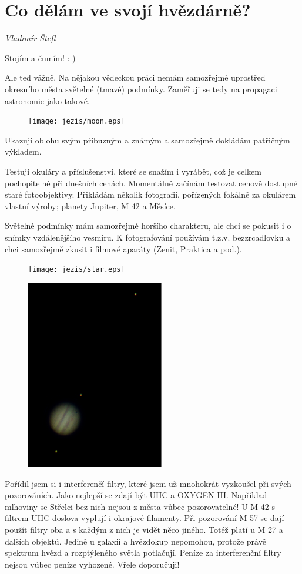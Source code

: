 \documentclass[10pt,a5paper,twoside]{book}
\newcommand{\autor}[1]{
	\begin{flushright}
	\textit{#1}
	\end{flushright}
}
\begin{document}
\section*{Co dělám ve svojí hvězdárně?}
\autor{Vladimír Štefl}
Stojím a čumím! :-)

Ale teď vážně. Na nějakou vědeckou práci nemám samozřejmě uprostřed okresního města světelné (tmavé) podmínky. Zaměřuji se tedy na propagaci astronomie jako takové.
\begin{figure}[htbp]
 \centering
  \texttt{[image: jezis/moon.eps]}
\end{figure}

Ukazuji oblohu svým příbuzným a známým a samozřejmě dokládám patřičným výkladem.

Testuji okuláry a  příslušenství, které se snažím i vyrábět, což je celkem pochopitelné při dnešních cenách.
Momentálně začínám testovat cenově dostupné staré fotoobjektivy. Přikládám několik fotografií, pořízených fokálně za okulárem vlastní výroby; planety Jupiter, M 42 a Měsíce.

Světelné podmínky mám samozřejmě horšího charakteru, ale chci se pokusit i o snímky vzdálenějšího vesmíru. K fotografování používám t.z.v. bezzrcadlovku a chci samozřejmě zkusit i filmové aparáty (Zenit, Praktica a pod.).
\begin{figure}[htbp]
 \centering
  \texttt{[image: jezis/star.eps]}
\end{figure}
\begin{figure}[htbp]
 \centering
  \includegraphics*[width=6cm]{jezis/plan.eps}
\end{figure}

Pořídil jsem si i interferenčí filtry, které jsem už mnohokrát vyzkoušel při svých pozorováních. Jako nejlepší se zdají být UHC a OXYGEN III. Například mlhoviny se Střelci bez nich nejsou z města vůbec pozorovatelné! U M 42 s filtrem UHC doslova vyplují i okrajové filamenty. Při pozorování M 57 se dají použít filtry oba a s každým z nich je vidět něco jiného. Totéž platí u M 27 a dalších objektů. Jedině u galaxií a hvězdokup nepomohou, protože právě spektrum hvězd a rozptýleného světla potlačují. Peníze za interferenční filtry nejsou vůbec peníze vyhozené. Vřele doporučuji! 
\end{document}
